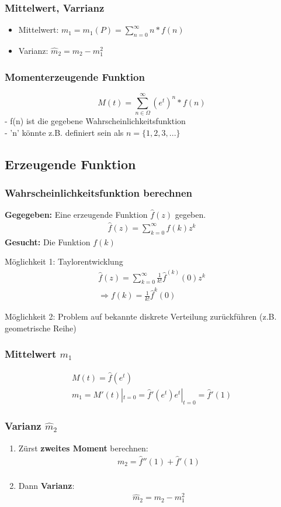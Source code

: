 \documentclass{article}
\begin{document}
	\subsubsection{Mittelwert, Varrianz}
	\begin{itemize}
		\item Mittelwert: $m_1 = m_1(P) = \sum_{n=0}^\infty n*f(n)$
		\item Varianz: $\widehat{m}_2 = m_2 - m_1^2$
	\end{itemize}
	\subsubsection{Momenterzeugende Funktion}
	\[
	M(t)=\sum_{n\in\Omega}^{\infty}(e^t)^n * f(n)
	\]
	- f(n) ist die gegebene Wahrscheinlichkeitsfunktion\\
	- 'n' könnte z.B. definiert sein als $n=\{1,2,3,...\}$
	\subsection{Erzeugende Funktion}
	\subsubsection{Wahrscheinlichkeitsfunktion berechnen}
	\textbf{Gegegeben:} Eine erzeugende Funktion $\hat{f}(z)$ gegeben.
	\begin{align}
	\hat{f}(z) = \sum^{\infty}_{k=0} f(k)z^k
	\end{align}
	\textbf{Gesucht:} Die Funktion $f(k)$
	
	Möglichkeit 1: Taylorentwicklung
	\begin{align}
	\hat{f}(z) = \sum_{k=0}^{\infty} \frac{1}{k!}\hat{f}^{(k)}(0)z^k\\
	\Rightarrow f(k) = \frac{1}{k!} \hat{f}^{k}(0)
	\end{align}
	
	Möglichkeit 2: Problem auf bekannte diskrete Verteilung zurückführen (z.B. geometrische
	Reihe)
	\subsubsection{Mittelwert $m_1$}
	\begin{align}
	M(t) = \hat{f}(e^t)\\
	m_1  = M'(t)|_{t=0} = \hat{f}'(e^t)e^t|_{t=0} = \hat{f}'(1)
	\end{align}
	\subsubsection{Varianz $\hat{m}_2$}
	\begin{enumerate}
		\item Zürst \textbf{zweites Moment} berechnen:
		\begin{align}
		m_2 = \hat{f}''(1) + \hat{f}'(1)\\
		\end{align}
		\item Dann \textbf{Varianz}:
		\begin{align}
		\hat{m}_2 = m_2 - m_1^2
		\end{align}
	\end{enumerate}
\end{document}
